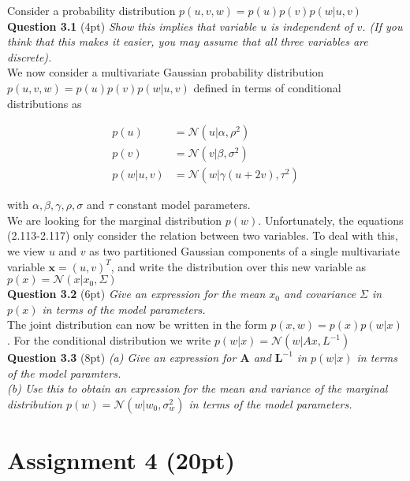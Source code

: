 \documentclass[a4paper]{article}
\begin{document}
Consider a probability distribution $p(u, v, w) = p(u)p(v)p(w | u, v)$\\

\textbf{Question 3.1} (4pt) \textit{Show this implies that variable $u$ is independent of $v$. (If you think that this makes it easier, you may assume that all three variables are discrete).}\\


We now consider a multivariate Gaussian probability distribution $p(u, v, w) = p(u)p(v)p(w | u, v)$ defined in terms of conditional distributions as

\begin{align}
	p(u) &= \mathcal{N}(u | \alpha, \rho^2)\\
	p(v) &= \mathcal{N}(v | \beta, \sigma^2)\\
	p(w | u, v) &= \mathcal{N}(w | \gamma(u + 2v), \tau^2)
\end{align}

with $\alpha, \beta, \gamma, \rho, \sigma$ and $\tau$ constant model parameters.\\

We are looking for the marginal distribution $p(w)$. Unfortunately, the equations (2.113-2.117) only consider the relation between two variables. To deal with this, we view $u$ and $v$ as two partitioned
Gaussian components of a single multivariate variable $\textbf{x} = (u,v)^T$, and write the distribution over this new variable as $p(x) = \mathcal{N}(x | x_0, \Sigma)$\\

\textbf{Question 3.2} (6pt) \textit{Give an expression for the mean $x_0$ and covariance $\Sigma$ in $p(x)$ in terms of the model parameters.}\\


The joint distribution can now be written in the form $p(x, w) = p(x)p(w | x)$. For the conditional distribution we write $p(w | x ) = \mathcal{N}(w | Ax, L^{-1})$\\

\textbf{Question 3.3} (8pt) \textit{(a) Give an expression for $\textbf{A}$ and $\textbf{L}^{-1}$ in $p(w | x)$ in terms of the model paramters.\\(b) Use this to obtain an expression for the mean and variance of the marginal distribution $p(w) = \mathcal{N}(w | w_0, \sigma^2_w)$ in terms of the model parameters.}\\


\section*{Assignment 4 (20pt)}
\end{document}
